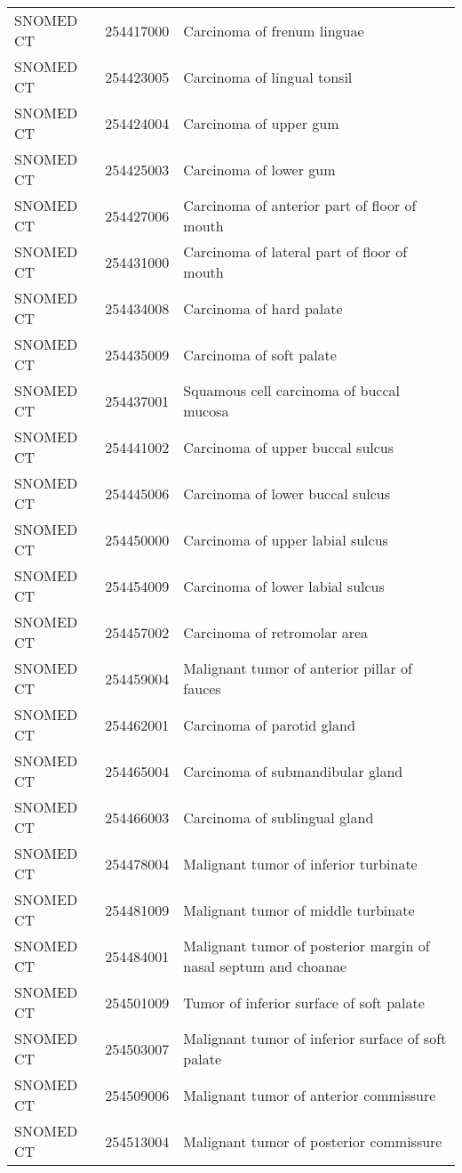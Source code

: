\begin{longtable}{p{}p{}p{}}
  SNOMED CT & 254417000 & Carcinoma of frenum linguae \\ 
  SNOMED CT & 254423005 & Carcinoma of lingual tonsil \\ 
  SNOMED CT & 254424004 & Carcinoma of upper gum \\ 
  SNOMED CT & 254425003 & Carcinoma of lower gum \\ 
  SNOMED CT & 254427006 & Carcinoma of anterior part of floor of mouth \\ 
  SNOMED CT & 254431000 & Carcinoma of lateral part of floor of mouth \\ 
  SNOMED CT & 254434008 & Carcinoma of hard palate \\ 
  SNOMED CT & 254435009 & Carcinoma of soft palate \\ 
  SNOMED CT & 254437001 & Squamous cell carcinoma of buccal mucosa \\ 
  SNOMED CT & 254441002 & Carcinoma of upper buccal sulcus \\ 
  SNOMED CT & 254445006 & Carcinoma of lower buccal sulcus \\ 
  SNOMED CT & 254450000 & Carcinoma of upper labial sulcus \\ 
  SNOMED CT & 254454009 & Carcinoma of lower labial sulcus \\ 
  SNOMED CT & 254457002 & Carcinoma of retromolar area \\ 
  SNOMED CT & 254459004 & Malignant tumor of anterior pillar of fauces \\ 
  SNOMED CT & 254462001 & Carcinoma of parotid gland \\ 
  SNOMED CT & 254465004 & Carcinoma of submandibular gland \\ 
  SNOMED CT & 254466003 & Carcinoma of sublingual gland \\ 
  SNOMED CT & 254478004 & Malignant tumor of inferior turbinate \\ 
  SNOMED CT & 254481009 & Malignant tumor of middle turbinate \\ 
  SNOMED CT & 254484001 & Malignant tumor of posterior margin of nasal septum and choanae \\ 
  SNOMED CT & 254501009 & Tumor of inferior surface of soft palate \\ 
  SNOMED CT & 254503007 & Malignant tumor of inferior surface of soft palate \\ 
  SNOMED CT & 254509006 & Malignant tumor of anterior commissure \\ 
  SNOMED CT & 254513004 & Malignant tumor of posterior commissure \\ 

\end{longtable}
